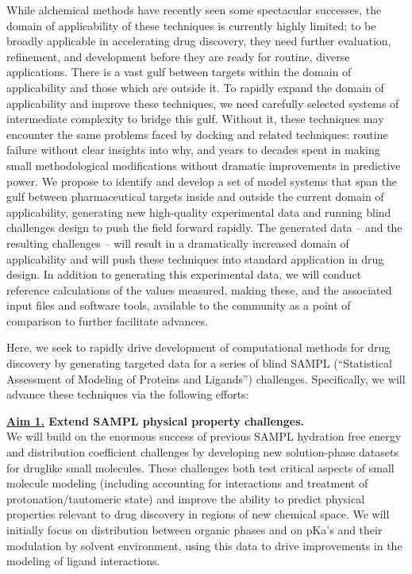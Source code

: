 \documentclass[11pt]{article}
\begin{document}
While alchemical methods have recently seen some spectacular successes, the domain of applicability of these techniques is currently highly limited; to be broadly applicable in accelerating drug discovery, they need further evaluation, refinement, and development before they are ready for routine, diverse applications. 
There is a vast gulf between targets within the domain of applicability and those which are outside it. 
To rapidly expand the domain of applicability and improve these techniques, we need carefully selected systems of intermediate complexity to bridge this gulf. 
Without it, these techniques may encounter the same problems faced by docking and related techniques: routine failure without clear insights into why, and years to decades spent in making small methodological modifications without dramatic improvements in predictive power.
We propose to identify and develop a set of model systems that span the gulf between pharmaceutical targets inside and outside the current domain of applicability, generating new high-quality experimental data and running blind challenges design to push the field forward rapidly.
The generated data -- and the resulting challenges -- will result in a dramatically increased domain of applicability and will push these techniques into standard application in drug design.
In addition to generating this experimental data, we will conduct reference calculations of the values measured, making these, and the associated input files and software tools, available to the community as a point of comparison to further facilitate advances.


Here, we seek to rapidly drive development of computational methods for drug discovery by generating targeted data for a series of blind SAMPL (``Statistical Assessment of Modeling of Proteins and Ligands'') challenges. Specifically, we will advance these techniques via the following efforts:

{\bf \underline{Aim 1.} Extend SAMPL physical property challenges.}\\
We will build on the enormous success of previous SAMPL hydration free energy and distribution coefficient challenges by developing new solution-phase datasets for druglike small molecules. 
These challenges both test critical aspects of small molecule modeling (including accounting for interactions and treatment of protonation/tautomeric state) and improve the ability to predict physical properties relevant to drug discovery in regions of new chemical space. 
We will initially focus on distribution between organic phases and on pKa's and their modulation by solvent environment, using this data to drive improvements in the modeling of ligand interactions.
\end{document}
